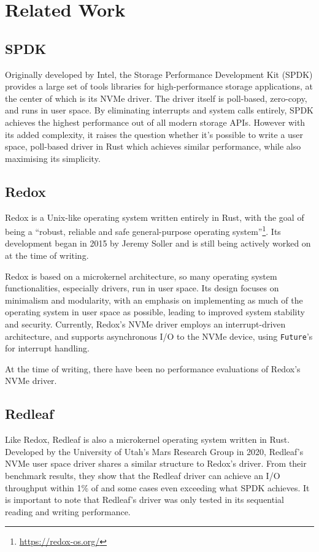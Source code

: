 \chapter{Related Work}\label{chapter:related}

\section{SPDK}
Originally developed by Intel, the Storage Performance Development Kit (SPDK) provides a large set of tools libraries for high-performance storage applications, at the center of which is its NVMe driver. The driver itself is poll-based, zero-copy, and runs in user space. By eliminating interrupts and system calls entirely, SPDK achieves the highest performance out of all modern storage APIs\cite{storage_api}. However with its added complexity, it raises the question whether it's possible to write a user space, poll-based driver in Rust which achieves similar performance, while also maximising its simplicity.

\section{Redox}
Redox is a Unix-like operating system written entirely in Rust, with the goal of being a ``robust, reliable and safe general-purpose operating system''\footnote{\url{https://redox-os.org/}}. Its development began in 2015 by Jeremy Soller and is still being actively worked on at the time of writing.

Redox is based on a microkernel architecture, so many operating system functionalities, especially drivers, run in user space. Its design focuses on minimalism and modularity, with an emphasis on implementing as much of the operating system in user space as possible, leading to improved system stability and security. Currently, Redox's NVMe driver employs an interrupt-driven architecture, and supports asynchronous I/O to the NVMe device, using \texttt{Future}'s for interrupt handling.

At the time of writing, there have been no performance evaluations of Redox's NVMe driver.

\section{Redleaf}
Like Redox, Redleaf is also a microkernel operating system written in Rust. Developed by the University of Utah's Mars Research Group in 2020, Redleaf's NVMe user space driver shares a similar structure to Redox's driver. From their benchmark results, they show that the Redleaf driver can achieve an I/O throughput within 1\% of and some cases even exceeding what SPDK achieves\cite{redleaf}. It is important to note that Redleaf's driver was only tested in its sequential reading and writing performance.

